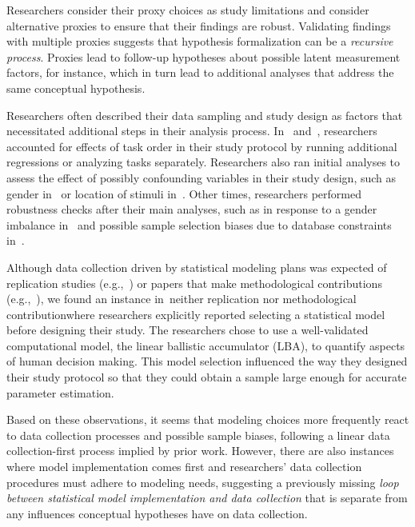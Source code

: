 


Researchers consider their proxy choices as study limitations and consider
alternative proxies to ensure that their findings are robust. Validating
findings with multiple proxies suggests that hypothesis formalization can be a
\emph{recursive process}. Proxies lead to follow-up hypotheses about possible
latent measurement factors, for instance, which in turn lead to additional analyses that address
the same conceptual hypothesis. 

Researchers often described their data sampling and study design as factors that
necessitated additional steps in their analysis process. In~\cite{PS0}
and~\cite{PS5}, researchers accounted for effects of task order in their study
protocol by running additional regressions or analyzing tasks separately.
Researchers also ran initial analyses to assess the effect of possibly
confounding variables in their study design, such as gender in~\cite{PS3} or
location of stimuli in~\cite{PS4}. Other times, researchers performed robustness
checks after their main analyses, such as in response to a gender imbalance
in~\cite{PS5} and possible sample selection biases due to database constraints
in~\cite{JFE1}.

Although data collection driven by statistical modeling plans was expected of
replication studies (e.g.,~\cite{PS8,PS5,PS0}) or papers that make
methodological contributions (e.g.,~\cite{JFE6, JFE7}), we found an instance
in~\cite{PS2}\textemdash neither replication nor methodological
contribution\textemdash where researchers explicitly reported selecting a
statistical model before designing their study. The researchers chose to use a
well-validated computational model, the linear ballistic accumulator (LBA), to
quantify aspects of human decision making. This model selection influenced the
way they designed their study protocol so that they could obtain a sample large
enough for accurate parameter estimation. 

Based on these observations, it seems that modeling choices more frequently
react to data collection processes and possible sample biases, following a
linear data collection-first process implied by prior work. However, there are
also instances where model implementation comes first and researchers' data
collection procedures must adhere to modeling needs, suggesting a previously
missing \emph{loop between statistical model implementation and data collection}
that is separate from any influences conceptual hypotheses have on data
collection. 

